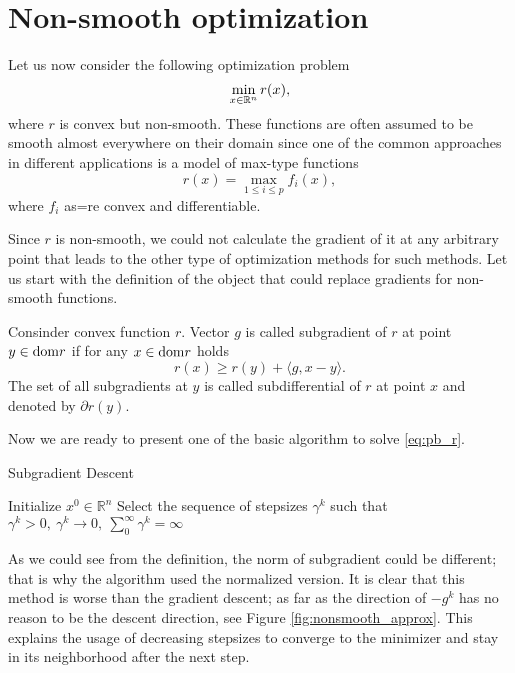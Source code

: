 \section{Non-smooth optimization}\label{sec:basics_nonsmooth}
Let us now consider the following optimization problem
\begin{equation}\label{eq:pb_r}
\min_{x\in\mathbb{R}^n} r(x),
\end{equation}
where $r$ is convex but non-smooth. {\color{blue}These functions are often assumed to be smooth almost everywhere on their domain since one of the common approaches in different applications is a model of max-type functions
$$
r(x) = \max_{1\leq i \leq p} f_i(x),
$$
where $f_i$ as=re convex and differentiable.
}

Since $r$ is non-smooth, we could not calculate the gradient of it at any arbitrary point that leads to the other type of optimization methods for such methods. {\color{blue}Let us start with the definition of the object that could replace gradients for non-smooth functions.}

\begin{definition}[Subgradient]
Consinder convex function $r$. Vector $g$ is called subgradient of $r$ at point $y\in\mathrm{dom} r$ if for any $x\in\mathrm{dom} r$ holds
\begin{equation}\label{eq:subgrad}
r(x)\geq r(y) + \langle g, x-y\rangle.
\end{equation}
The set of all subgradients at $y$ is called subdifferential of $r$ at point $x$ and denoted by $\partial r(y)$.
\end{definition}

Now we are ready to present one of the basic algorithm \cite[Chapter $3$]{nesterov-book} to solve \eqref{eq:pb_r}.

\begin{algorithm}
    \caption{Subgradient Descent}
    \label{algo:sd}
    \begin{algorithmic}
        \STATE Initialize $x^0\in\mathbb{R}^n$
        \STATE Select the sequence of stepsizes $\gamma^k$ such that
        $
            \gamma^k>0,~\gamma^k\rightarrow 0,~\sum_0^\infty \gamma^k = \infty
        $
        \ENDFOR
    \end{algorithmic}
\end{algorithm}

As we could see from the definition, the norm of subgradient could be different; that is why the algorithm used the normalized version. It is clear that this method is worse than the gradient descent; as far as the direction of $-g^k$ has no reason to be the descent direction, see Figure \ref{fig:nonsmooth_approx}. This explains the usage of decreasing stepsizes to converge to the minimizer and stay in its neighborhood after the next step.


